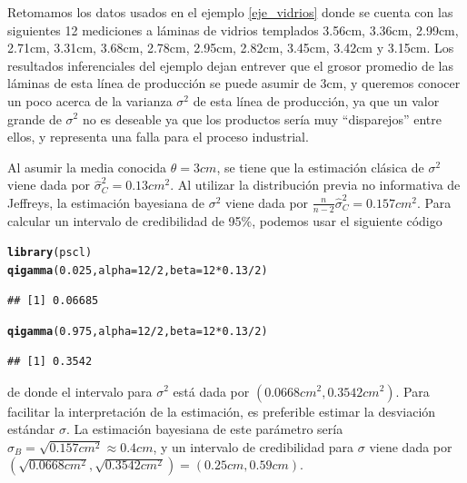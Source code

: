 \documentclass[10pt,openright]{book}\usepackage[]{graphicx}\usepackage[]{color}
\makeatletter
\newcommand{\hlnum}[1]{\textcolor[rgb]{0.686,0.059,0.569}{#1}}%
\newcommand{\hlopt}[1]{\textcolor[rgb]{0,0,0}{#1}}%
\newcommand{\hlstd}[1]{\textcolor[rgb]{0.345,0.345,0.345}{#1}}%
\newcommand{\hlkwc}[1]{\textcolor[rgb]{0.333,0.667,0.333}{#1}}%
\newcommand{\hlkwd}[1]{\textcolor[rgb]{0.737,0.353,0.396}{\textbf{#1}}}%
\newenvironment{kframe}{%
 \def\at@end@of@kframe{}%
 \ifinner\ifhmode%
  \def\at@end@of@kframe{\end{minipage}}%
  \begin{minipage}{\columnwidth}%
 \fi\fi%
 \def\FrameCommand##1{\hskip\@totalleftmargin \hskip-\fboxsep
 \colorbox{shadecolor}{##1}\hskip-\fboxsep
     \hskip-\linewidth \hskip-\@totalleftmargin \hskip\columnwidth}%
 \MakeFramed {\advance\hsize-\width
   \@totalleftmargin\z@ \linewidth\hsize
   \@setminipage}}%
 {\par\unskip\endMakeFramed%
 \at@end@of@kframe}
\newenvironment{knitrout}{}{} %
\makeatother
\begin{document}
    \begin{Eje}
    Retomamos los datos usados en el ejemplo \ref{eje_vidrios} donde se cuenta con las siguientes 12 mediciones a l\'aminas de vidrios templados 3.56cm, 3.36cm, 2.99cm, 2.71cm, 3.31cm, 3.68cm, 2.78cm, 2.95cm, 2.82cm, 3.45cm, 3.42cm y 3.15cm. Los resultados inferenciales del ejemplo dejan entrever que el grosor promedio de las l\'aminas de esta l\'inea de producci\'on se puede asumir de 3cm, y queremos conocer un poco acerca de la varianza $\sigma^2$ de esta l\'inea de producci\'on, ya que un valor grande de $\sigma^2$ no es deseable ya que los productos ser\'ia muy ``disparejos'' entre ellos, y representa una falla para el proceso industrial. 
    
    Al asumir la media conocida $\theta=3cm$, se tiene que la estimaci\'on cl\'asica de $\sigma^2$ viene dada por $\hat{\sigma}^2_C=0.13cm^2$. Al utilizar la distribuci\'on previa no informativa de Jeffreys, la estimaci\'on bayesiana de $\sigma^2$ viene dada por $\frac{n}{n-2}\hat{\sigma}^2_C=0.157cm^2$. Para calcular un intervalo de credibilidad de 95\%, podemos usar el siguiente c\'odigo
\begin{knitrout}
\color{fgcolor}\begin{kframe}
\begin{alltt}
\hlkwd{library}\hlstd{(pscl)}
\hlkwd{qigamma}\hlstd{(}\hlnum{0.025}\hlstd{,} \hlkwc{alpha}\hlstd{=}\hlnum{12}\hlopt{/}\hlnum{2}\hlstd{,} \hlkwc{beta}\hlstd{=}\hlnum{12}\hlopt{*}\hlnum{0.13}\hlopt{/}\hlnum{2}\hlstd{)}
\end{alltt}
\begin{verbatim}
## [1] 0.06685
\end{verbatim}
\begin{alltt}
\hlkwd{qigamma}\hlstd{(}\hlnum{0.975}\hlstd{,} \hlkwc{alpha}\hlstd{=}\hlnum{12}\hlopt{/}\hlnum{2}\hlstd{,} \hlkwc{beta}\hlstd{=}\hlnum{12}\hlopt{*}\hlnum{0.13}\hlopt{/}\hlnum{2}\hlstd{)}
\end{alltt}
\begin{verbatim}
## [1] 0.3542
\end{verbatim}
\end{kframe}
\end{knitrout}
    
    de donde el intervalo para $\sigma^2$ est\'a dada por $(0.0668cm^2,0.3542cm^2)$. Para facilitar la interpretaci\'on de la estimaci\'on, es preferible estimar la desviaci\'on est\'andar $\sigma$. La estimaci\'on bayesiana de este par\'ametro ser\'ia $\hat{\sigma}_B=\sqrt{0.157cm^2}\approx 0.4cm$, y un intervalo de credibilidad para $\sigma$ viene dada por $(\sqrt{0.0668cm^2},\sqrt{0.3542cm^2})=(0.25cm,0.59cm)$.
    

\end{Eje}
\end{document}
